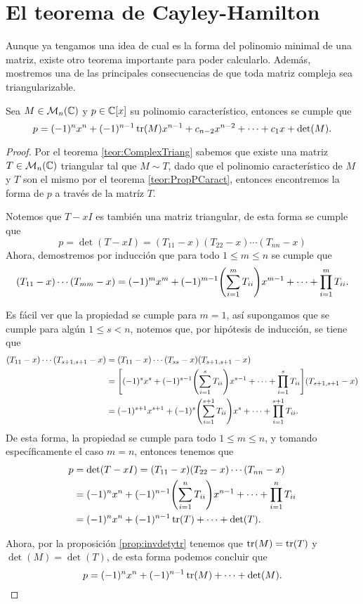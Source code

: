 \section{El teorema de Cayley-Hamilton} \label{sec:Cayley-Hamilton}

Aunque ya tengamos una idea de cual es la forma del polinomio minimal de una matriz, existe otro teorema importante para poder calcularlo. Además, mostremos una de las principales consecuencias de que toda matriz compleja sea triangularizable.

\begin{teor}\label{teor:CaracPolyForm}
  Sea $M \in \mathcal{M}_n(\mathbb{C})$ y $p \in \mathbb{C}[x]$ su polinomio característico, entonces se cumple que
    \[ p = (-1)^n x^n + (-1)^{n-1} \operatorname{tr}(M) x^{n-1} + c_{n-2}x^{n-2} + \cdots + c_1 x + \det(M). \]
\end{teor}

\begin{proof}
  Por el teorema \ref{teor:ComplexTriang} sabemos que existe una matriz $T \in \mathcal{M}_n(\mathbb{C})$ triangular tal que $M \sim T$, dado que el polinomio característico de $M$ y $T$ son el mismo por el teorema \ref{teor:PropPCaract}, entonces encontremos la forma de $p$ a través de la matríz $T$.

  Notemos que $T-xI$ es también una matriz triangular, de esta forma se cumple que
  \[
    p = \det(T-xI) = (T_{11}-x)(T_{22}-x)\cdots(T_{nn}-x)
  \]
  Ahora, demostremos por inducción que para todo $1 \leq m \leq n$ se cumple que
    \[ (T_{11}-x)\cdots(T_{mm}-x) = (-1)^m x^m + (-1)^{m-1}\paren{\sum_{i=1}^m T_{ii}}x^{m-1} + \cdots + \prod_{i=1}^m T_{ii}. \]

  Es fácil ver que la propiedad se cumple para $m=1$, así supongamos que se cumple para algún $1 \leq s < n$, notemos que, por hipótesis de inducción, se tiene que
  \begin{align*}
    (T_{11}-x)\cdots(T_{s+1,s+1}-x) &= (T_{11}-x)\cdots(T_{ss}-x)(T_{s+1,s+1}-x) \\
      &= \corch{(-1)^s x^s + (-1)^{s-1}\paren{\sum_{i=1}^s T_{ii}}x^{s-1} + \cdots + \prod_{i=1}^s T_{ii}} (T_{s+1,s+1}-x) \\
      &= (-1)^{s+1} x^{s+1} + (-1)^{s}\paren{\sum_{i=1}^{s+1} T_{ii}}x^{s} + \cdots + \prod_{i=1}^{s+1}T_{ii}.
  \end{align*}
  De esta forma, la propiedad se cumple para todo $1\leq m \leq n$, y tomando específicamente el caso $m=n$, entonces tenemos que 
  \begin{align*}
    p &= \det(T-xI) = (T_{11}-x)(T_{22}-x)\cdots(T_{nn}-x)   \\
      &= (-1)^n x^n + (-1)^{n-1}\paren{\sum_{i=1}^n T_{ii}}x^{n-1} + \cdots + \prod_{i=1}^n T_{ii} \\
      &= (-1)^n x^n + (-1)^{n-1} \tr(T)  + \cdots + \det(T).
  \end{align*}

  Ahora, por la proposición \ref{prop:invdetytr} tenemos que $\operatorname{tr}(M) = \operatorname{tr}(T)$ y $\det(M) = \det(T)$, de esta forma podemos concluir que
  \[
    p = (-1)^n x^n + (-1)^{n-1} \operatorname{tr}(M)  + \cdots + \det(M). \qedhere
  \]
\end{proof}

